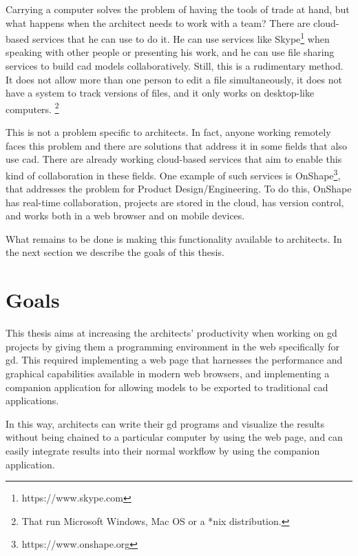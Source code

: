 Carrying a computer solves the problem of having the tools of trade at hand, but what happens when the architect needs to work with a team?
There are cloud-based services that he can use to do it.
He can use services like Skype\footnote{https://www.skype.com} when speaking with other people or presenting his work, and he can use file sharing services to build \gls{cad} models collaboratively.
Still, this is a rudimentary method.
It does not allow more than one person to edit a file simultaneously, it does not have a system to track versions of files, and it only works on desktop-like computers.%
\footnote{That run Microsoft Windows, Mac OS or a *nix distribution.}

This is not a problem specific to architects.
In fact, anyone working remotely faces this problem and there are solutions that address it in some fields that also use \gls{cad}.
There are already working cloud-based services that aim to enable this kind of collaboration in these fields.
One example of such services is OnShape\footnote{https://www.onshape.org}, that addresses the problem for Product Design/Engineering.
To do this, OnShape has real-time collaboration, projects are stored in the cloud, has version control, and works both in a web browser and on mobile devices.

What remains to be done is making this functionality available to architects.
In the next section we describe the goals of this thesis.


\section{Goals}
This thesis aims at increasing the architects' productivity when working on \gls{gd} projects by giving them a programming environment in the web specifically for \gls{gd}.
This required implementing a web page that harnesses the performance and graphical capabilities available in modern web browsers, and implementing a companion application for allowing models to be exported to traditional \gls{cad} applications.

In this way, architects can write their \gls{gd} programs and visualize the results without being chained to a particular computer by using the web page, and can easily integrate results into their normal workflow by using the companion application.


